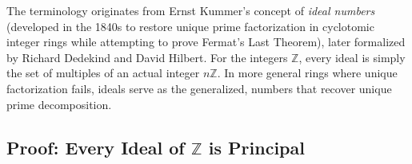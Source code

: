 \begin{insight}
The terminology  originates from Ernst Kummer's concept of \emph{ideal numbers} (developed in the 1840s to restore unique prime factorization in cyclotomic integer rings while attempting to prove Fermat's Last Theorem), later formalized by Richard Dedekind and David Hilbert. For the integers $\mathbb{Z}$, every ideal is simply the set of multiples of an actual integer $n\mathbb{Z}$. In more general rings where unique factorization fails, ideals serve as the generalized,  numbers that recover unique prime decomposition.
\end{insight}

\begin{hidden}
\end{hidden}

\subsection{Proof: Every Ideal of \texorpdfstring{$\mathbb{Z}$}{Z} is Principal}

\begin{content}
\end{content}

